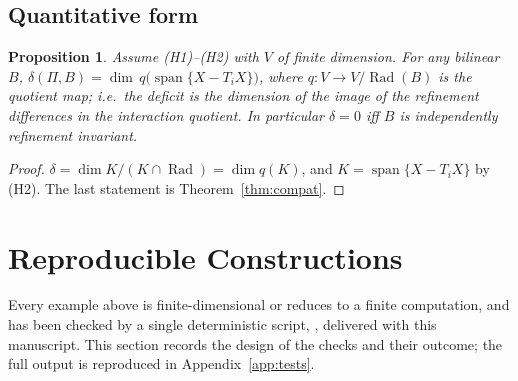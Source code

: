 \documentclass[11pt,a4paper]{article}
\newcommand{\Rad}{\operatorname{Rad}}
\newcommand{\spn}{\operatorname{span}}
\newcommand{\defic}{\delta}
\theoremstyle{plain}
\newtheorem{proposition}[theorem]{Proposition}
\theoremstyle{definition}
\begin{document}
\subsection{Quantitative form}
\begin{proposition}\label{prop:quant}
Assume (H1)--(H2) with $V$ of finite dimension. For any bilinear $B$, $\defic(\Pi,B)=\dim\,q\bigl(\spn\{X-T_iX\}\bigr)$, where $q\colon V\to V/\Rad(B)$ is the quotient map; i.e.\ the deficit is the dimension of the image of the refinement differences in the interaction quotient. In particular $\defic=0$ iff $B$ is independently refinement invariant.
\end{proposition}
\begin{proof}
$\defic=\dim K/(K\cap\Rad)=\dim q(K)$, and $K=\spn\{X-T_iX\}$ by (H2). The last statement is Theorem~\ref{thm:compat}.
\end{proof}

\section{Reproducible Constructions}\label{sec:repro}
Every example above is finite-dimensional or reduces to a finite computation, and has been checked by a single deterministic script, , delivered with this manuscript. This section records the design of the checks and their outcome; the full output is reproduced in Appendix~\ref{app:tests}.
\end{document}
